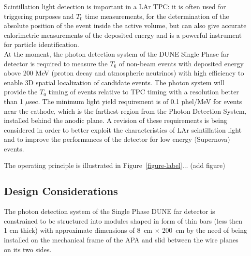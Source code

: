 Scintillation light detection is important in a LAr TPC: it is often 
used for triggering purposes and $T_0$ time measurements, for the 
determination of the absolute position of the event inside the active volume, 
but can also give accurate calorimetric measurements of the deposited energy 
and is a powerful instrument for particle identification.\\

At the moment, the photon detection system of  the DUNE Single Phase far 
detector is required to measure the $T_0$ of non-beam events with deposited 
energy above 200 MeV (proton decay and atmospheric neutrinos) with high 
efficiency to enable 3D spatial localization of candidate events. The photon
system will provide the $T_0$ timing of events relative to TPC timing with a 
resolution better than 1 $\mu$sec. The minimum light yield requirement is of 
0.1 phel/MeV for events near the cathode, which is the farthest region from 
the Photon Detection System, installed behind the anodic plane. A revision 
of these requirements is being considered in order to better exploit the 
characteristics of LAr scintillation light and to improve the performances 
of the detector for low energy (Supernova) events.


The operating principle is illustrated in Figure~\ref{figure-label}... (add figure)



\subsection{Design Considerations}
\label{sec:fdsp-pd-des-consid}

The photon detection system of the Single Phase DUNE far detector is 
constrained to be structured into modules shaped in form of thin bars (less 
then 1 cm thick) with approximate dimensions of 8~cm $\times$ 200~cm by the need of 
being installed on the mechanical frame of the APA and slid between the wire
planes on its two sides.


